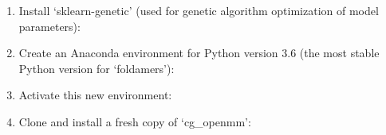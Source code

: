 \documentclass[letterpaper,12pt,english,openany,oneside]{sphinxmanual}
\begin{document}
\begin{enumerate}
\def\theenumi{\arabic{enumi}}
\def\labelenumi{\theenumi )}
\makeatletter\def\p@enumii{\p@enumi \theenumi )}\makeatother
\item {} 
Install ‘sklearn-genetic’ (used for genetic algorithm optimization of model parameters):

\begin{sphinxVerbatim}[commandchars=\\\{\}]
  
\end{sphinxVerbatim}

\item {} 
Create an Anaconda environment for Python version 3.6 (the most stable Python version for ‘foldamers’):

\begin{sphinxVerbatim}[commandchars=\\\{\}]
          
\end{sphinxVerbatim}

\item {} 
Activate this new environment:

\begin{sphinxVerbatim}[commandchars=\\\{\}]
  
\end{sphinxVerbatim}

\item {} 
Clone and install a fresh copy of ‘cg\_openmm’:

\begin{sphinxVerbatim}[commandchars=\\\{\}]
  
 
  
\end{sphinxVerbatim}


\end{enumerate}
\end{document}
